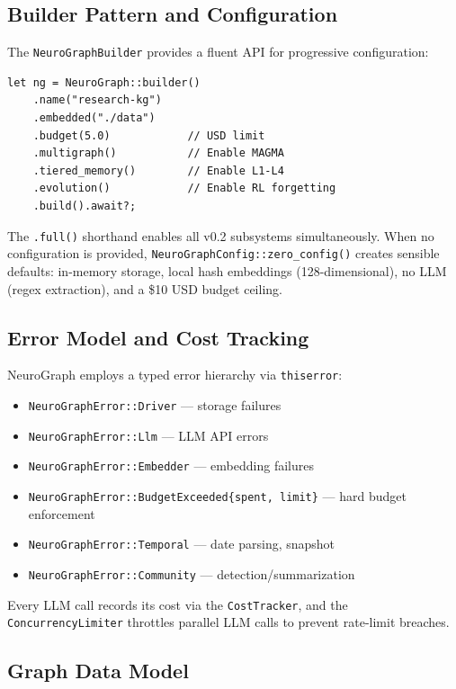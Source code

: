\documentclass[11pt,a4paper,twocolumn]{article}
\begin{document}
\subsection{Builder Pattern and Configuration}

The \texttt{NeuroGraphBuilder} provides a fluent API for progressive
configuration:

\begin{lstlisting}
let ng = NeuroGraph::builder()
    .name("research-kg")
    .embedded("./data")
    .budget(5.0)            // USD limit
    .multigraph()           // Enable MAGMA
    .tiered_memory()        // Enable L1-L4
    .evolution()            // Enable RL forgetting
    .build().await?;
\end{lstlisting}

The \texttt{.full()} shorthand enables all v0.2 subsystems
simultaneously. When no configuration is provided,
\texttt{NeuroGraphConfig::zero\_config()} creates sensible defaults:
in-memory storage, local hash embeddings (128-dimensional), no LLM
(regex extraction), and a \$10 USD budget ceiling.

\subsection{Error Model and Cost Tracking}

NeuroGraph employs a typed error hierarchy via \texttt{thiserror}:

\begin{itemize}[leftmargin=*]
  \item \texttt{NeuroGraphError::Driver} --- storage failures
  \item \texttt{NeuroGraphError::Llm} --- LLM API errors
  \item \texttt{NeuroGraphError::Embedder} --- embedding failures
  \item \texttt{NeuroGraphError::BudgetExceeded\{spent, limit\}} ---
    hard budget enforcement
  \item \texttt{NeuroGraphError::Temporal} --- date parsing, snapshot
  \item \texttt{NeuroGraphError::Community} --- detection/summarization
\end{itemize}

Every LLM call records its cost via the \texttt{CostTracker}, and
the \texttt{ConcurrencyLimiter} throttles parallel LLM calls to
prevent rate-limit breaches.

\subsection{Graph Data Model}
\label{sec:datamodel}
\end{document}
